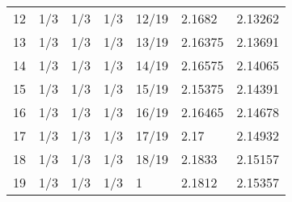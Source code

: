 \begin{tabular}{lllllll}
12 &   1/3 &   1/3 &   1/3 &  12/19 &                                             2.1682 &                                            2.13262 \\
13 &   1/3 &   1/3 &   1/3 &  13/19 &                                            2.16375 &                                            2.13691 \\
14 &   1/3 &   1/3 &   1/3 &  14/19 &                                            2.16575 &                                            2.14065 \\
15 &   1/3 &   1/3 &   1/3 &  15/19 &                                            2.15375 &                                            2.14391 \\
16 &   1/3 &   1/3 &   1/3 &  16/19 &                                            2.16465 &                                            2.14678 \\
17 &   1/3 &   1/3 &   1/3 &  17/19 &                                               2.17 &                                            2.14932 \\
18 &   1/3 &   1/3 &   1/3 &  18/19 &                                             2.1833 &                                            2.15157 \\
19 &   1/3 &   1/3 &   1/3 &      1 &                                             2.1812 &                                            2.15357 \\
\bottomrule
\end{tabular}
